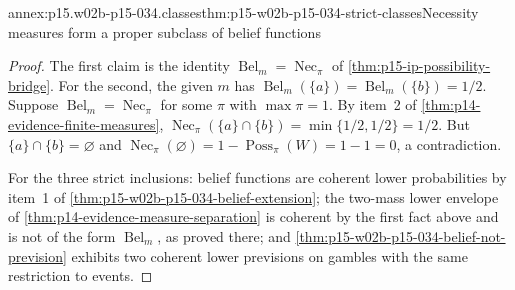 \begin{annexitem}{annex:p15.w02b-p15-034.classes}{thm:p15-w02b-p15-034-strict-classes}{Necessity measures form a proper subclass of belief functions}
\begin{proof}
The first claim is the identity
\(\operatorname{Bel}_m=\operatorname{Nec}_\pi\) of
\cref{thm:p15-ip-possibility-bridge}. For the second, the given \(m\) has
\(\operatorname{Bel}_m(\{a\})=\operatorname{Bel}_m(\{b\})=1/2\). Suppose
\(\operatorname{Bel}_m=\operatorname{Nec}_\pi\) for some \(\pi\) with
\(\max\pi=1\). By item~2 of \cref{thm:p14-evidence-finite-measures},
\(\operatorname{Nec}_\pi(\{a\}\cap\{b\})=\min\{1/2,1/2\}=1/2\). But
\(\{a\}\cap\{b\}=\varnothing\) and
\(\operatorname{Nec}_\pi(\varnothing)=1-\operatorname{Poss}_\pi(W)=1-1=0\),
a contradiction.

For the three strict inclusions: belief functions are coherent lower
probabilities by item~1 of \cref{thm:p15-w02b-p15-034-belief-extension};
the two-mass lower envelope of \cref{thm:p14-evidence-measure-separation}
is coherent by the first fact above and is not of the form
\(\operatorname{Bel}_m\), as proved there; and
\cref{thm:p15-w02b-p15-034-belief-not-prevision} exhibits two coherent
lower previsions on gambles with the same restriction to events.
\end{proof}
\end{annexitem}

